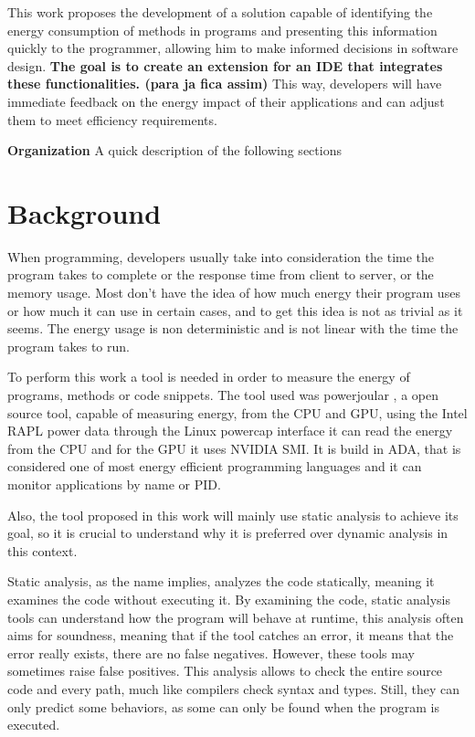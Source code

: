 \documentclass[sigplan]{acmart}
\begin{document}
This work proposes the development of a solution capable of identifying the energy consumption of methods in programs and presenting this information quickly to the programmer, allowing him to make informed decisions in software design. \textbf{The goal is to create an extension for an IDE that integrates these functionalities. (para ja fica assim)} This way, developers will have immediate feedback on the energy impact of their applications and can adjust them to meet efficiency requirements. 

\textbf{Organization} A quick description of the following sections 

\section{Background} \label{sec:background}

When programming, developers usually take into consideration the time the program takes to complete or the response time from client to server, or the memory usage. Most don't have the idea of how much energy their program uses or how much it can use in certain cases, and to get this idea is not as trivial as it seems. The energy usage is non deterministic and is not linear with the time the program takes to run.

To perform this work a tool is needed in order to measure the energy of programs, methods or code snippets. The tool used was powerjoular \cite{noureddine-ie-2022}, a open source tool, capable of measuring energy, from the CPU and GPU, using the Intel RAPL power data through the Linux powercap interface it can read the energy from the CPU and for the GPU it uses NVIDIA SMI. It is build in ADA, that is considered one of most energy efficient programming languages and it can monitor applications by name or PID.

Also, the tool proposed in this work will mainly use static analysis to achieve its goal, so it is crucial to understand why it is preferred over dynamic analysis in this context.

Static analysis, as the name implies, analyzes the code statically, meaning it examines the code without executing it. By examining the code, static analysis tools can understand how the program will behave at runtime\cite{ernst2003static}, this analysis often aims for soundness, meaning that if the tool catches an error, it means that the error really exists, there are no false negatives. However, these tools may sometimes raise false positives. This analysis allows to check the entire source code and every path, much like compilers check syntax and types. Still, they can only predict some behaviors, as some can only be found when the program is executed.
\end{document}
